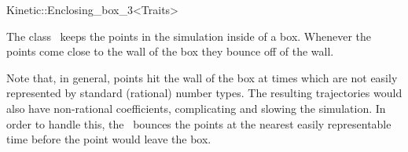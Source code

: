 

\begin{ccRefClass}{Kinetic::Enclosing_box_3<Traits>}  %


\ccDefinition
  
The class \ccRefName\ keeps the points in the simulation inside of a
box. Whenever the points come close to the wall of the box they bounce
off of the wall.


Note that, in general, points hit the wall of the box at times which
are not easily represented by standard (rational) number types. The
resulting trajectories would also have non-rational coefficients,
complicating and slowing the simulation. In order to handle this, the
\ccRefName\ bounces the points at the nearest easily representable
time before the point would leave the box.


\ccTypes


\ccCreation
{}  %




\end{ccRefClass}


